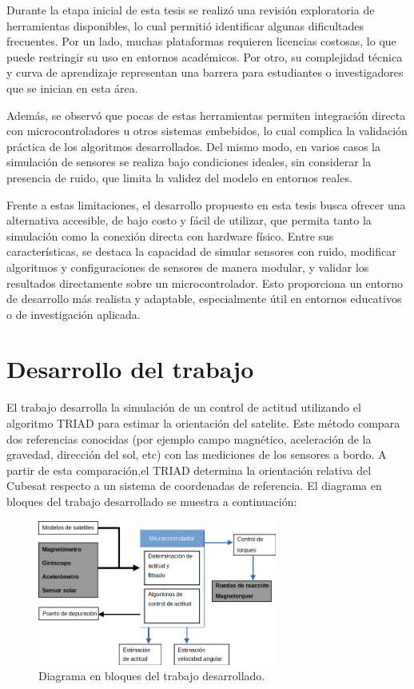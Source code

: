 Durante la etapa inicial de esta tesis se realizó una revisión exploratoria de herramientas disponibles, lo cual permitió identificar algunas dificultades frecuentes. Por un lado, muchas plataformas requieren licencias costosas, lo que puede restringir su uso en entornos académicos. Por otro, su complejidad técnica y curva de aprendizaje representan una barrera para estudiantes o investigadores que se inician en esta área. 

Además, se observó que pocas de estas herramientas permiten integración directa con microcontroladores u otros sistemas embebidos, lo cual complica la validación práctica de los algoritmos desarrollados. Del mismo modo, en varios casos la simulación de sensores se realiza bajo condiciones ideales, sin considerar la presencia de ruido, que limita la validez del modelo en entornos reales. 

Frente a estas limitaciones, el desarrollo propuesto en esta tesis busca ofrecer una alternativa accesible, de bajo costo y fácil de utilizar, que permita tanto la simulación como la conexión directa con hardware físico. Entre sus características, se destaca la capacidad de simular sensores con ruido, modificar algoritmos y configuraciones de sensores de manera modular, y validar los resultados directamente sobre un microcontrolador. Esto proporciona un entorno de desarrollo más realista y adaptable, especialmente útil en entornos educativos o de investigación aplicada. 



\section{Desarrollo del trabajo}
	El trabajo desarrolla la simulación de un control de actitud utilizando el algoritmo TRIAD para estimar la orientación del satelite. Este método compara dos referencias conocidas (por ejemplo campo magnético, aceleración de la gravedad, dirección del sol, etc) con las mediciones de los sensores a bordo. A partir de esta comparación,el TRIAD determina la orientación relativa del Cubesat respecto a un sistema de coordenadas de referencia. El diagrama en bloques del trabajo desarrollado se muestra a continuación: 
	\begin{figure}[htbp]
		\centering
		\includegraphics[width=0.7\textwidth]{./Figures/sistemaadcs.png}
		\caption{Diagrama en bloques del trabajo desarrollado.}
		\label{fig:simulate_sistem}
	\end{figure}

